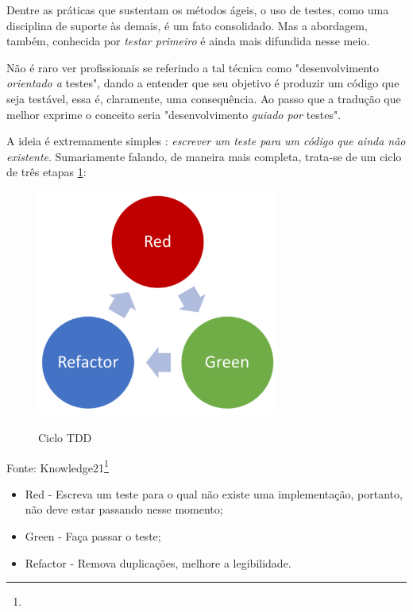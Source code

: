 \documentclass[12pt,a4paper,oneside,english,brazil]{article}
\begin{document}
      Dentre as práticas que sustentam os métodos ágeis, o uso de testes, como
      uma disciplina de suporte às demais, é um fato consolidado. Mas a
      abordagem, também, conhecida por \emph{testar primeiro} é ainda mais
      difundida nesse  meio.

      Não é raro ver profissionais se referindo a tal técnica como
      "desenvolvimento \emph{orientado a} testes", dando a entender que seu
      objetivo é produzir um código que seja testável, essa é, claramente, uma
      consequência. Ao passo que a tradução que melhor exprime o conceito seria
      "desenvolvimento \emph{guiado por} testes".

      A ideia é extremamente simples \cite[p.1]{FreemanPryce2009}: \emph{escrever um
      teste para um código que ainda não existente}. Sumariamente falando, de
      maneira mais completa, trata-se de um ciclo de três etapas
      \ref{fig:ciclotdd}:

      \begin{center}
        \begin{figure}[htb]
          \centering
          \caption{Ciclo TDD}
          \includegraphics[width=8cm]{ciclo-tdd}
          \label{fig:ciclotdd}
        \end{figure}
        Fonte: Knowledge21\footnote{}
      \end{center}

      \begin{itemize}
        \item Red - Escreva um teste para o qual não existe uma
          implementação, portanto, não deve estar passando nesse
          momento;
        \item Green - Faça passar o teste;
        \item Refactor - Remova duplicações,  melhore a legibilidade.
      \end{itemize}
\end{document}

